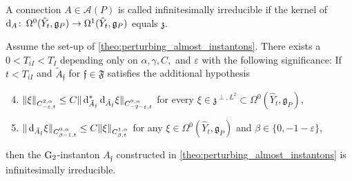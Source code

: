 \documentclass[11pt,a4paper]{scrartcl}
\newcommand*\diff{\mathop{}\!\textup{d}}
\newcommand{\col}{\colon \thinspace}
\newcommand{\VertWHt}[3]{\Vert_{C^{{#1},\alpha}_{{#2},t}{#3}}}
\newcommand{\G}{\textup{G}}
\numberwithin{equation}{section}
\theoremstyle{plain}
\theoremstyle{definition}
\theoremstyle{remark}
\begin{document}
\begin{definition}\label{def:infinitesimally-irreducible}
A connection $A \in \mathcal{A}(P)$ is called infinitesimally irreducible if the kernel of $\diff_A \col \Omega^0(\hat{Y}_t,\mathfrak{g}_P) \to \Omega^1(\hat{Y}_t,\mathfrak{g}_P)$ equals $\mathfrak{z}$.
\end{definition}

\begin{proposition}\label{prop:infinitesimal_irreducibility}
Assume the set-up of \autoref{theo:perturbing_almost_instantons}. There exists a $0<T_{iI}<T_I$ depending only on $\alpha,\gamma,C,$ and $\varepsilon$ with the following significance: If $t<T_{iI}$ and $\tilde{A}_{\mathfrak{f}}$ for ${\mathfrak{f}}\in \mathfrak{F}$ satisfies the additional hypothesis
\begin{enumerate}
\setcounter{enumi}{3}
\item \label{bul:infinitesimally_irreducible} $\Vert \xi \VertWHt{2}{-\varepsilon}{} \leq C \Vert \diff_{\tilde{A}_{\mathfrak{f}}}^*\diff_{\tilde{A}_{\mathfrak{f}}} \xi \VertWHt{0}{-2-\varepsilon}{}$ for every $\xi \in \mathfrak{z}^{\perp,L^2} \subset \Omega^0(\hat{Y}_t,\mathfrak{g}_P)$,
\item \label{bul: estimate on diff_A} $\Vert \diff_{\tilde{A}_{\mathfrak{f}}} \xi \VertWHt{0}{\beta-1}{} \leq C \Vert \xi \VertWHt{1}{\beta}{}$ for any $\xi \in \Omega^0(\hat{Y}_t,\mathfrak{g}_P)$ and $\beta \in \{0, -1-\varepsilon\}$,
\end{enumerate}
then the $\G_2$-instanton $A_{\mathfrak{f}}$ constructed in \autoref{theo:perturbing_almost_instantons} is infinitesimally irreducible.
\end{proposition}
\end{document}
